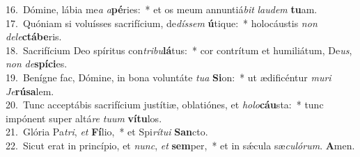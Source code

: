 {16.~}Dómine, lábia me\textit{a} \textit{a}\textbf{pé}ries:~* et os meum annuntiá\textit{bit} \textit{lau}\textit{dem} \textbf{tu}am.\\
{17.~}Quóniam si voluísses sacrifícium, de\textit{dís}\textit{sem} \textbf{ú}tique:~* holocáustis \textit{non} \textit{de}\textit{le}\textbf{ctá}\textbf{be}ris.\\
{18.~}Sacrifícium Deo spíritus con\textit{tri}\textit{bu}\textbf{lá}tus:~* cor contrítum et humiliátum, De\textit{us}, \textit{non} \textit{de}\textbf{spí}\textbf{ci}es.\\
{19.~}Benígne fac, Dómine, in bona voluntáte \textit{tu}\textit{a} \textbf{Si}on:~* ut ædificéntur \textit{mu}\textit{ri} \textit{Je}\textbf{rú}\textbf{sa}lem.\\
{20.~}Tunc acceptábis sacrifícium justítiæ, oblatiónes, et \textit{ho}\textit{lo}\textbf{cáu}sta:~* tunc impónent super altá\textit{re} \textit{tu}\textit{um} \textbf{ví}\textbf{tu}los.\\
{21.~}Glória Pa\textit{tri}, \textit{et} \textbf{Fí}lio,~* et Spi\textit{rí}\textit{tu}\textit{i} \textbf{San}cto.\\
{22.~}Sicut erat in princípio, et \textit{nunc}, \textit{et} \textbf{sem}per,~* et in sǽcula sæ\textit{cu}\textit{ló}\textit{rum}. \textbf{A}men.\\

